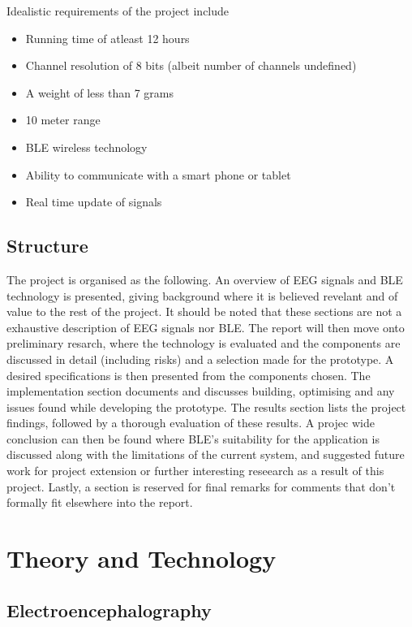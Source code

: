 \documentclass[]{article}
\begin{document}
Idealistic requirements of the project include 
\begin{itemize}
	\item Running time of atleast 12 hours
	\item Channel resolution of 8 bits (albeit number of channels undefined)
	\item A weight of less than 7 grams
	\item 10 meter range
	\item BLE wireless technology
	\item Ability to communicate with a smart phone or tablet
	\item Real time update of signals
\end{itemize}

\subsection {Structure}
The project is organised as the following. An overview of \ac{EEG} signals and \ac{BLE} technology is presented, giving background where it is believed revelant and of value to the rest of the project. It should be noted that these sections are not a exhaustive description of \ac{EEG} signals nor \ac{BLE}. The report will then move onto preliminary resarch, where the technology is evaluated and the components are discussed in detail (including risks) and a selection made for the prototype. A desired specifications is then presented from the components chosen.  The implementation section documents and discusses building, optimising and any issues found while developing the prototype. The results section lists the project findings, followed by a thorough evaluation of these results. A projec wide conclusion can then be found where \ac{BLE}'s suitability for the application is discussed along with the limitations of the current system, and suggested future work for project extension or further interesting reseearch as a result of this project. Lastly, a section is reserved for final remarks for comments that don't formally fit elsewhere into the report.

\clearpage
\section{Theory and Technology}
\subsection{Electroencephalography}
\end{document}
